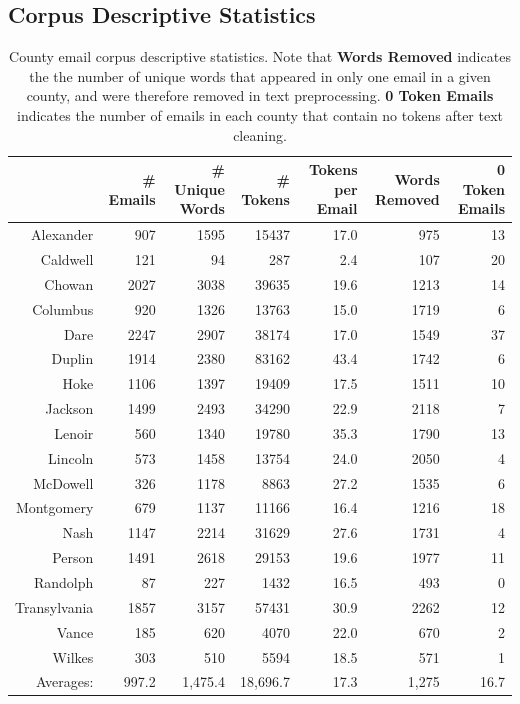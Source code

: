 \documentclass{pnastwo}
\begin{document}
\begin{article}
\section{Corpus Descriptive Statistics}



\begin{table}[ht]
\centering
\begin{tabular}{rrrrrrr}
  \toprule
 & \# Emails & \# Unique Words & \# Tokens & Tokens per Email & Words Removed & 0 Token Emails \\ 
  \midrule
Alexander & 907 & 1595 & 15437 & 17.0 & 975 & 13 \\ 
\rowcolor{lred}
  Caldwell & 121 & 94 & 287 & 2.4 & 107 & 20 \\ 
  Chowan & 2027 & 3038 & 39635 & 19.6 & 1213 & 14 \\ 
  Columbus & 920 & 1326 & 13763 & 15.0 & 1719 & 6 \\ 
  Dare & 2247 & 2907 & 38174 & 17.0 & 1549 & 37 \\ 
  Duplin & 1914 & 2380 & 83162 & 43.4 & 1742 & 6 \\ 
  Hoke & 1106 & 1397 & 19409 & 17.5 & 1511 & 10 \\ 
  Jackson & 1499 & 2493 & 34290 & 22.9 & 2118 & 7 \\ 
  Lenoir & 560 & 1340 & 19780 & 35.3 & 1790 & 13 \\ 
  Lincoln & 573 & 1458 & 13754 & 24.0 & 2050 & 4 \\ 
  McDowell & 326 & 1178 & 8863 & 27.2 & 1535 & 6 \\ 
  Montgomery & 679 & 1137 & 11166 & 16.4 & 1216 & 18 \\ 
  Nash & 1147 & 2214 & 31629 & 27.6 & 1731 & 4 \\ 
  Person & 1491 & 2618 & 29153 & 19.6 & 1977 & 11 \\
  \rowcolor{lred} 
  Randolph & 87 & 227 & 1432 & 16.5 & 493 & 0 \\ 
  Transylvania & 1857 & 3157 & 57431 & 30.9 & 2262 & 12 \\ 
  Vance & 185 & 620 & 4070 & 22.0 & 670 & 2 \\ 
  Wilkes & 303 & 510 & 5594 & 18.5 & 571 & 1 \\
  \midrule
  Averages: & 997.2 &  1,475.4 & 18,696.7 & 17.3 & 1,275 & 16.7 \\
   \bottomrule
\end{tabular}
\caption{\label{tab:corpus desc stats} County email corpus descriptive statistics. Note that \textbf{Words Removed} indicates the the number of unique words that appeared in only one email in a given county, and were therefore removed in text preprocessing. \textbf{0 Token Emails} indicates the number of emails in each county that contain no tokens after text cleaning.}
\end{table}


\end{article}
\end{document}

